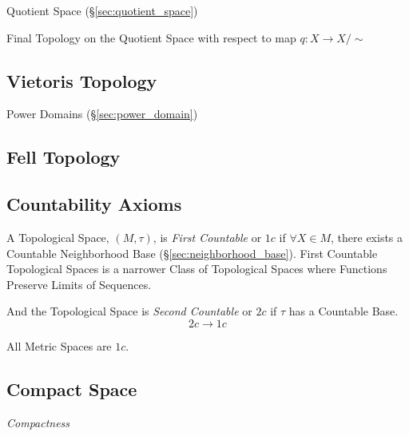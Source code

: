 Quotient Space (\S\ref{sec:quotient_space})

Final Topology on the Quotient Space with respect to map $q : X
\rightarrow X / \sim$



\subsection{Vietoris Topology}\label{sec:vietoris_topology}

\fist Power Domains (\S\ref{sec:power_domain})



\subsection{Fell Topology}\label{sec:fell_topology}

\subsection{Countability Axioms}\label{sec:countability_axioms}

A Topological Space, $(M,\tau)$, is \emph{First Countable} or $1c$ if
$\forall X \in M$, there exists a Countable Neighborhood Base
(\S\ref{sec:neighborhood_base}). First Countable Topological Spaces is
a narrower Class of Topological Spaces where Functions Preserve Limits
of Sequences. %

And the Topological Space is \emph{Second Countable} or $2c$ if $\tau$
has a Countable Base.
\[
  2c \rightarrow 1c
\]

All Metric Spaces are $1c$.



\subsection{Compact Space}\label{sec:compact_space}

\emph{Compactness}

